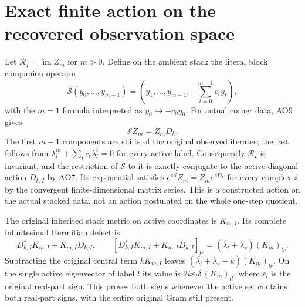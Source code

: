 \documentclass[11pt]{article}
\begin{document}
\section{Exact finite action on the recovered observation space}
Let $\mathcal R_I=\operatorname{im}Z_m$ for $m>0$. Define on the
ambient stack the literal block companion operator
\begin{equation}
 \mathcal S(y_0,\ldots,y_{m-1})
    =(y_1,\ldots,y_{m-1},-\sum_{t=0}^{m-1}c_ty_t),
 \tag{AO10}
\end{equation}
with the $m=1$ formula interpreted as $y_0\mapsto-c_0y_0$.
For actual corner data, AO9 gives
\begin{equation}
 \mathcal S Z_m=Z_mD_k.\tag{AO11}
\end{equation}
The first $m-1$ components are shifts of the original observed
iterates; the last follows from
$\lambda_l^m+\sum_tc_t\lambda_l^t=0$ for every active label.
Consequently $\mathcal R_I$ is invariant, and the restriction
of $\mathcal S$ to it is exactly conjugate to the active
diagonal action $D_{k,I}$ by AO7. Its exponential satisfies
$e^{z\mathcal S}Z_m=Z_m e^{zD_k}$ for every complex $z$ by
the convergent finite-dimensional matrix series. This is a
constructed action on the actual stacked data, not an action
postulated on the whole one-step quotient.

The original inherited stack metric on active coordinates is
$K_{m,I}$. Its complete infinitesimal Hermitian defect is
\begin{equation}
 D_{k,I}^*K_{m,I}+K_{m,I}D_{k,I},\qquad
 [D_{k,I}^*K_{m,I}+K_{m,I}D_{k,I}]_{lr}
       =(\overline{\lambda_l}+\lambda_r)(K_m)_{lr}.
 \tag{AO12}
\end{equation}
Subtracting the original central term $kK_{m,I}$ leaves
$(\overline{\lambda_l}+\lambda_r-k)(K_m)_{lr}$.
On the single active eigenvector of label $l$ its value is
$2k\varepsilon_l\delta\,(K_m)_{ll}$, where
$\varepsilon_l$ is the original real-part sign. This proves
both signs whenever the active set contains both real-part
signs, with the entire original Gram still present.
\end{document}
